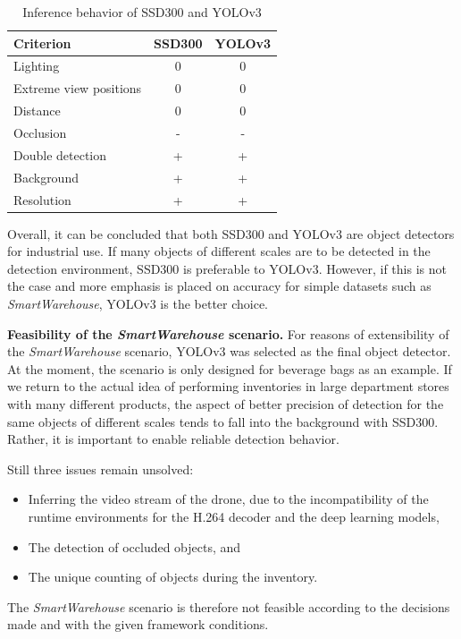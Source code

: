 \documentclass[a4paper, 10pt, journal]{wissarbIEEE}      %
\begin{document}
\begin{table}[h]
	\caption{Inference behavior of SSD300 and YOLOv3}
	\begin{tabularx}{0.48\textwidth}{lcc}
		\toprule 
		Criterion & SSD300 & YOLOv3 \\
		\midrule
		Lighting & 0 & 0 \\
		Extreme view positions & 0 & 0 \\
		Distance & 0 & 0 \\
		Occlusion & - & - \\
		Double detection & + & + \\
		Background & + & + \\
		Resolution & + & + \\
		\bottomrule
	\end{tabularx}  \label{inference}
\end{table}
 
Overall, it can be concluded that both SSD300 and YOLOv3 are object detectors for industrial use. If many objects of different scales are to be detected in the detection environment, SSD300 is preferable to YOLOv3. However, if this is not the case and more emphasis is placed on accuracy for simple datasets such as \textit{SmartWarehouse}, YOLOv3 is the better choice.

\textbf{Feasibility of the \textit{SmartWarehouse} scenario.} For reasons of extensibility of the \textit{SmartWarehouse} scenario, YOLOv3 was selected as the final object detector. At the moment, the scenario is only designed for beverage bags as an example. If we return to the actual idea of performing inventories in large department stores with many different products, the aspect of better precision of detection for the same objects of different scales tends to fall into the background with SSD300. Rather, it is important to enable reliable detection behavior.

Still three issues remain unsolved:

\begin{itemize}
	\item Inferring the video stream of the drone, due to the incompatibility of the runtime environments for the H.264 decoder and the deep learning models,
	\item The detection of occluded objects, and
	\item The unique counting of objects during the inventory.
\end{itemize}

The \textit{SmartWarehouse} scenario is therefore not feasible according to the decisions made and with the given framework conditions.
\end{document}
